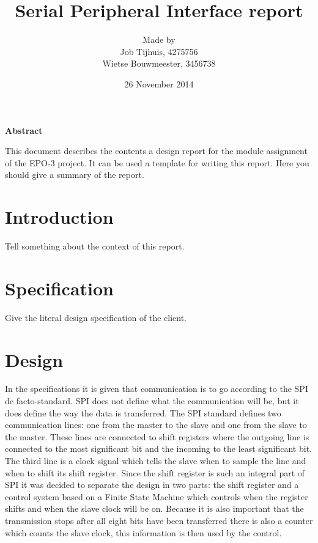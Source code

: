 \documentclass[11pt,twoside,a4paper]{article}
\title{Serial Peripheral Interface report}
\author{
Made by\\
Job Tijhuis, 4275756\\
Wietse Bouwmeester, 3456738\\
}
\date{26 November 2014}
\begin{document}
\maketitle
\thispagestyle{empty}
\vspace{30 mm}
\begin{center}
\Large \bf 
Abstract
\end{center}
This document describes the contents a design report for the module assignment of the EPO-3 project. 
It can be used a template for writing this report. 
Here you should give a summary of the report.
\clearpage

\tableofcontents
\clearpage

\section{Introduction}
Tell something about the context of this report.

\section{Specification}
Give the literal design specification of the client.

\section{Design}
In the specifications it is given that communication is to go according to the SPI de facto-standard. SPI does not define what the communication will be, but it does define the way the data is transferred. The SPI standard defines two communication lines: one from the master to the slave and one from the slave to the master. These lines are connected to shift registers where the outgoing line is connected to the most significant bit and the incoming to the least significant bit. The third line is a clock signal which tells the slave when to sample the line and when to shift its shift register. Since the shift register is such an integral part of SPI it was decided to separate the design in two parts: the shift register and a control system based on a Finite State Machine which controls when the register shifts and when the slave clock will be on. Because it is also important that the transmission stops after all eight bits have been transferred there is also a counter which counts the slave clock, this information is then used by the control.
\end{document}
